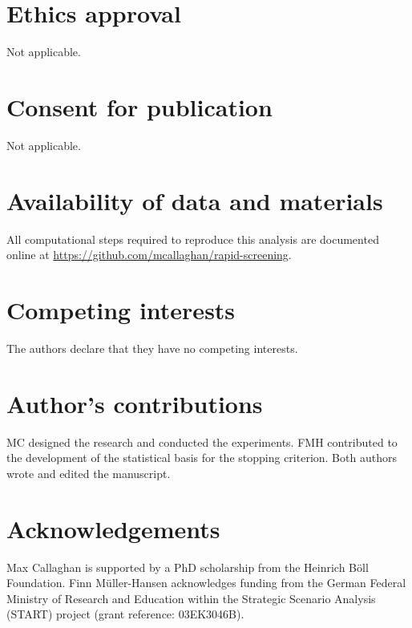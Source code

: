 \documentclass{bmcart}
\begin{document}
	
	\begin{backmatter}
		
		\section*{Ethics approval}
		Not applicable.
		
		\section*{Consent for publication}
		Not applicable.
		
		\section*{Availability of data and materials} 
		All computational steps required to reproduce this analysis are documented online at \url{https://github.com/mcallaghan/rapid-screening}.
		
		\section*{Competing interests}
		The authors declare that they have no competing interests.
		
		\section*{Author's contributions}
		MC designed the research and conducted the experiments. FMH contributed to the development of the statistical basis for the stopping criterion. Both authors wrote and edited the manuscript.
		
		\section*{Acknowledgements}
		Max Callaghan is supported by a PhD scholarship from the Heinrich Böll Foundation. Finn M\"{u}ller-Hansen acknowledges funding from the German Federal Ministry of Research and Education within the Strategic Scenario Analysis (START) project (grant reference: 03EK3046B).
		
		
		
		
	\end{backmatter}
\end{document}
